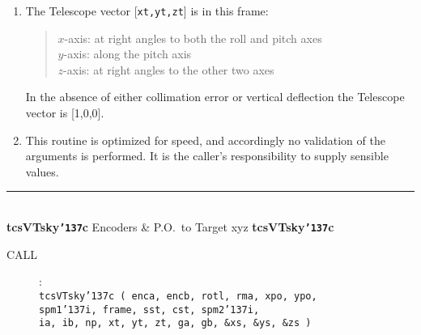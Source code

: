 \documentclass[12pt,fleqn,twoside]{article}
\renewcommand{\_}{{\tt\char'137}}     %
\newcommand{\radec}     {$[\,\alpha,\delta\,]$}
\newcommand{\hadec}     {$[\,h,\delta\,]$}
\newcommand{\azel}      {$[\,Az,El~]$}
\newcommand{\routine}[2]
{
  \newpage
  \rule{\textwidth}{0.3mm}\\ \nopagebreak
  {\Large {\bf #1} \hfill #2 \hfill {\bf #1}}
  \vspace{-1ex}
}
\newcommand{\call}[1]
{
  \goodbreak
  \begin{description}
    \item[CALL]: \\[0.5ex] \nopagebreak
        {\tt #1}
  \end{description}
  \vspace{-3ex}
}
\begin{document}
{\begin{enumerate}
\begin{tabbing}
         \> {\tt sst,cst} \> \radec\ $\Leftarrow$ \hadec \\
         \> {\tt spm2\_i} \> geocentric \hadec\ $\Leftarrow$ {\sc Aim}
      \end{tabbing}
      \begin{tabbing}
         xxx \= xxxxxxxxxx \= \kill
         \> {\tt frame  } \> {\tt APPT\_TOPO} \\
         \> {\tt target } \> topocentric apparent \radec \\
         \> {\tt spm1\_i} \> identity matrix \\
         \> {\tt sst,cst} \> \radec\ $\Leftarrow$ \hadec \\
         \> {\tt spm2\_i} \> topocentric \hadec\ $\Leftarrow$ {\sc Aim}
      \end{tabbing}
      \begin{tabbing}
         xxx \= xxxxxxxxxx \= \kill
         \> {\tt frame  } \> {\tt AZEL\_TOPO} \\
         \> {\tt target } \> topocentric \azel\ (N thru E) \\
         \> {\tt spm1\_i} \> identity matrix \\
         \> {\tt sst,cst} \> not used \\
         \> {\tt spm2\_i} \> topocentric \azel\ $\Leftarrow$ {\sc Aim}
      \end{tabbing}

      ICRS $\approx$ FK5 J2000 to better than 25 mas.
\item The {\sc Telescope} vector [{\tt xt,yt,zt}] is in this frame:
      \begin{quote}
      $x$-axis:  at right angles to both the roll and pitch axes \\
      $y$-axis:  along the pitch axis \\
      $z$-axis:  at right angles to the other two axes
      \end{quote}
      In the absence of either collimation error or vertical deflection
      the {\sc Telescope} vector is [1,0,0].
\item This routine is optimized for speed, and accordingly no validation
      of the arguments is performed.  It is the caller's responsibility
      to supply sensible values.
\end{enumerate}
}
\routine{tcsVTsky\_c}{Encoders \& P.O.~to Target xyz}
\label{tcsVTsky_c}
\call{tcsVTsky\_c ( enca, encb, rotl, rma, xpo, ypo, \\
     \hspace*{6.1em} spm1\_i, frame, sst, cst, spm2\_i, \\
     \hspace*{6.1em} ia, ib, np, xt, yt, zt, ga, gb,
                     \&xs, \&ys, \&zs )}
\end{document}
